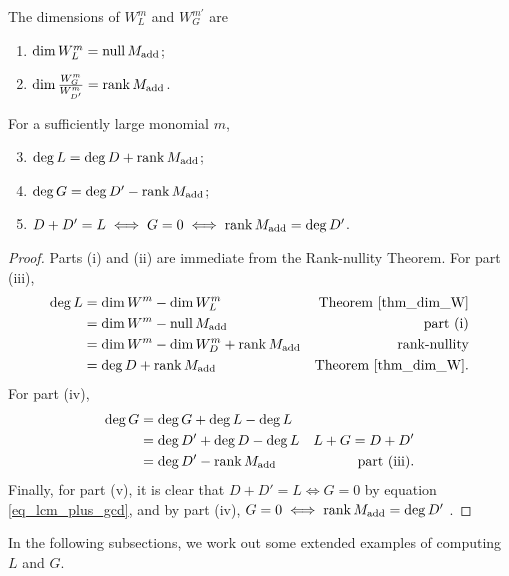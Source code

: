 \begin{proposition}
  \label{prop_deg_L_G}
  The dimensions of $W_L^m$ and $W_G^{m'}$ are
  \begin{enumerate}[label=(\roman*)]
    \item $\dim W_L^m    = \operatorname{null} M_{\text{add}}$;
    \item $\dim \frac {W_G^m} {W_{D'}^m} = \operatorname{rank} M_{\text{add}}$.
  \end{enumerate}
  For a sufficiently large monomial $m$,
  \begin{enumerate}[label=(\roman*)]
    \setcounter{enumi}{2}
    \item $\deg L = \deg D  + \operatorname{rank} M_{\text{add}}$;
    \item $\deg G = \deg D' - \operatorname{rank} M_{\text{add}}$;
    \item $D + D' = L \iff G = 0 \iff \operatorname{rank} M_{\text{add}} = \deg D'$.
  \end{enumerate}
\end{proposition}
\begin{proof}
  Parts (i) and (ii) are immediate from the Rank-nullity Theorem.
  For part (iii),
  \begin{align*}
    \deg L
      &= \dim W^m - \dim W_L^m & \text{Theorem \ref{thm_dim_W}} \\
      &= \dim W^m - \operatorname{null} M_{\text{add}} & \text{part (i)} \\
      &= \dim W^m - \dim W_D^m + \operatorname{rank} M_{\text{add}} & \text{rank-nullity} \\
      &= \deg D + \operatorname{rank} M_{\text{add}} & \text{Theorem \ref{thm_dim_W}}.
  \end{align*}
  For part (iv),
  \begin{align*}
    \deg G
      &= \deg G + \deg L - \deg L \\
      &= \deg D' + \deg D - \deg L & L + G = D + D' \\
      &= \deg D' - \operatorname{rank} M_{\text{add}} & \text{part (iii)}.
  \end{align*}
  Finally, for part (v), it is clear that $D + D' = L \iff G = 0$ by equation \ref{eq_lcm_plus_gcd},
  and by part (iv), $G = 0 \iff \operatorname{rank} M_{\text{add}} = \deg D'$ .
\end{proof}

In the following subsections, we work out some extended examples of computing $L$ and $G$.




